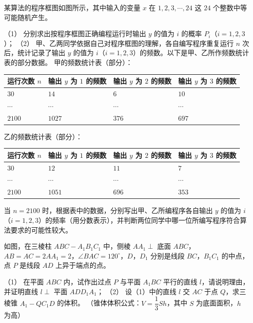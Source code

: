 \begin{question}
某算法的程序框图如图所示，其中输入的变量 $x$ 在 $1,2,3,\cdots,24$ 这 $24$ 个整数中等可能随机产生。
\nopagebreak[4]
\begin{center}\end{center}
\nopagebreak[4]
（1） 分别求出按程序框图正确编程运行时输出 $y$ 的值为 $i$ 的概率 $P_i$（$i=1,2,3$）；
（2） 甲、乙两同学依据自己对程序框图的理解，各自编写程序重复运行 $n$ 次后，统计记录了输出 $y$ 的值为 $i$（$i=1,2,3$）的频数。以下是甲、乙所作频数统计表的部分数据。
甲的频数统计表（部分）：
\begin{center}
\begin{tabular}{llll}
\toprule
运行次数 $n$ & 输出 $y$ 为 $1$ 的频数 & 输出 $y$ 为 $2$ 的频数 & 输出 $y$ 为 $3$ 的频数 \\
\midrule
$30$ & $14$ & $6$ & $10$ \\
$\cdots$ & $\cdots$ & $\cdots$ & $\cdots$ \\
$2100$ & $1027$ & $376$ & $697$ \\
\bottomrule
\end{tabular}
\end{center}
乙的频数统计表（部分）：
\begin{center}
\begin{tabular}{llll}
\toprule
运行次数 $n$ & 输出 $y$ 为 $1$ 的频数 & 输出 $y$ 为 $2$ 的频数 & 输出 $y$ 为 $3$ 的频数 \\
\midrule
$30$ & $12$ & $11$ & $7$ \\
$\cdots$ & $\cdots$ & $\cdots$ & $\cdots$ \\
$2100$ & $1051$ & $696$ & $353$ \\
\bottomrule
\end{tabular}
\end{center}
当 $n=2100$ 时，根据表中的数据，分别写出甲、乙所编程序各自输出 $y$ 的值为 $i$（$i=1,2,3$）的频率（用分数表示），并判断两位同学中哪一位所编写程序符合算法要求的可能性较大。
\Needspace{0.4\textheight}
\end{question}
\begin{question}
如图，在三棱柱 $ABC-A_1B_1C_1$ 中，侧棱 $AA_1\perp$ 底面 $ABC$，$AB=AC=2AA_1=2$，$\angle BAC=120^\circ$，$D$，$D_1$ 分别是线段 $BC$，$B_1C_1$ 的中点，点 $P$ 是线段 $AD$ 上异于端点的点。
\nopagebreak[4]
\begin{center}\end{center}
\nopagebreak[4]
（1） 在平面 $ABC$ 内，试作出过点 $P$ 与平面 $A_1BC$ 平行的直线 $l$，请说明理由，并证明直线 $l\perp$ 平面 $ADD_1A_1$；
（2） 设（1）中的直线 $l$ 交 $AC$ 于点 $Q$，求三棱锥 $A_1-QC_1D$ 的体积。
（锥体体积公式：$V=\dfrac13Sh$，其中 $S$ 为底面面积，$h$ 为高）
\end{question}
